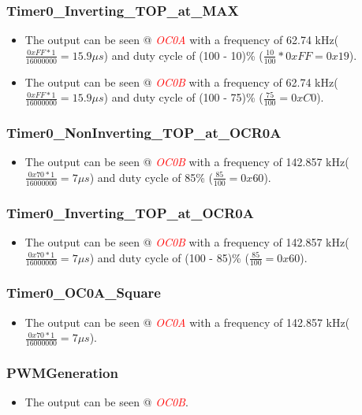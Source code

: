 \documentclass[oneside]{book}
\newcommand{\pinFormat}[1]{\emph{\textcolor{red}{#1}}}
\begin{document}
\subsubsection{Timer0\_Inverting\_TOP\_at\_MAX}
\begin{itemize}
    \item The output can be seen @ \pinFormat{OC0A} with a frequency of 62.74 kHz($\frac{0xFF * 1}{16000000} = 15.9\mu s$) and duty cycle of (100 - 10)\% ($\frac{10}{100} * 0xFF = 0x19$).
    \item The output can be seen @ \pinFormat{OC0B} with a frequency of 62.74 kHz($\frac{0xFF * 1}{16000000} = 15.9\mu s$) and duty cycle of (100 - 75)\% ($\frac{75}{100} = 0xC0$).
\end{itemize}
\subsubsection{Timer0\_NonInverting\_TOP\_at\_OCR0A}
\begin{itemize}
    \item The output can be seen @ \pinFormat{OC0B} with a frequency of 142.857 kHz($\frac{0x70 * 1}{16000000} = 7\mu s$) and duty cycle of 85\% ($\frac{85}{100} = 0x60$).
\end{itemize}
\subsubsection{Timer0\_Inverting\_TOP\_at\_OCR0A}
\begin{itemize}
    \item The output can be seen @ \pinFormat{OC0B} with a frequency of 142.857 kHz($\frac{0x70 * 1}{16000000} = 7\mu s$) and duty cycle of (100 - 85)\% ($\frac{85}{100} = 0x60$).
\end{itemize}
\subsubsection{Timer0\_OC0A\_Square}
\begin{itemize}
    \item The output can be seen @ \pinFormat{OC0A} with a frequency of 142.857 kHz($\frac{0x70 * 1}{16000000} = 7\mu s$).
\end{itemize}
\subsubsection{PWMGeneration}
\begin{itemize}
    \item The output can be seen @ \pinFormat{OC0B}.
\end{itemize}
\end{document}
